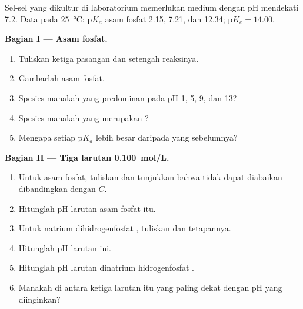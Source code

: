 \begin{problem}
\label{pb:b1:predominant-reaction:1}
Sel-sel yang dikultur di laboratorium memerlukan medium dengan pH
mendekati 7.2. Data pada \qty{25}{\celsius}: $\mathrm{p}K_a$ asam fosfat
2.15, 7.21, dan 12.34; $\mathrm{p}K_e = 14.00$.

\medskip
\noindent\textbf{Bagian I --- Asam fosfat.}
\begin{enumerate}
  \item Tuliskan ketiga pasangan dan setengah reaksinya.
  \item Gambarlah  asam fosfat.
  \item Spesies manakah yang predominan pada pH 1, 5, 9, dan 13?
  \item Spesies manakah yang merupakan ?
  \item Mengapa setiap $\mathrm{p}K_a$ lebih besar daripada yang
        sebelumnya?
\end{enumerate}

\medskip
\noindent\textbf{Bagian II --- Tiga larutan \qty{0.100}{mol/L}.}
\begin{enumerate}[resume]
  \item Untuk asam fosfat, tuliskan  dan tunjukkan
        bahwa  tidak dapat diabaikan dibandingkan
        dengan $C$.
  \item Hitunglah pH larutan asam fosfat itu.
  \item Untuk natrium dihidrogenfosfat , tuliskan  dan tetapannya.
  \item Hitunglah pH larutan ini.
  \item Hitunglah pH larutan dinatrium hidrogenfosfat .
  \item Manakah di antara ketiga larutan itu yang paling dekat dengan pH
        yang diinginkan?
\end{enumerate}


\end{problem}
